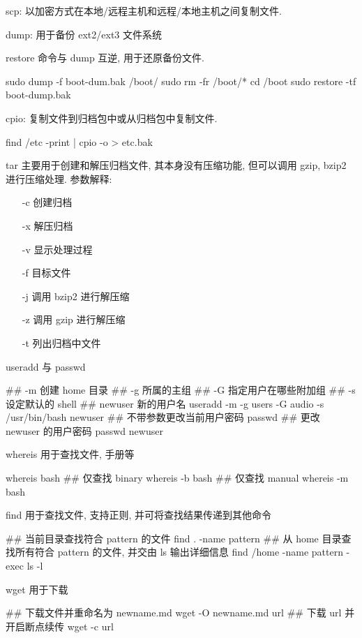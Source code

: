 scp: 以加密方式在本地/远程主机和远程/本地主机之间复制文件.

dump: 用于备份 ext2/ext3 文件系统

restore 命令与 dump 互逆, 用于还原备份文件.
\begin{shell}
sudo dump -f boot-dum.bak /boot/
sudo rm -fr /boot/*
cd /boot
sudo restore -tf boot-dump.bak
\end{shell}

cpio: 复制文件到归档包中或从归档包中复制文件.
\begin{shell}
find /etc -print | cpio -o > etc.bak
\end{shell}

tar 主要用于创建和解压归档文件, 其本身没有压缩功能, 但可以调用 gzip, bzip2 进行压缩处理.
参数解释:
\begin{itemize}
 \item[-c] 创建归档
 \item[-x] 解压归档
 \item[-v] 显示处理过程
 \item[-f] 目标文件
 \item[-j] 调用 bzip2 进行解压缩
 \item[-z] 调用 gzip 进行解压缩
 \item[-t] 列出归档中文件
\end{itemize}

useradd 与 passwd
\begin{shell}
## -m 创建 home 目录
## -g 所属的主组
## -G 指定用户在哪些附加组
## -s 设定默认的 shell
## newuser 新的用户名
useradd -m -g users -G audio -s /usr/bin/bash newuser
## 不带参数更改当前用户密码
passwd
## 更改 newuser 的用户密码
passwd newuser
\end{shell}

whereis 用于查找文件, 手册等
\begin{shell}
whereis bash
## 仅查找 binary
whereis -b bash
## 仅查找 manual
whereis -m bash
\end{shell}

find 用于查找文件, 支持正则, 并可将查找结果传递到其他命令
\begin{shell}
## 当前目录查找符合 pattern 的文件
find . -name pattern
## 从 home 目录查找所有符合 pattern 的文件, 并交由 ls 输出详细信息
find /home -name pattern -exec ls -l {} \;
\end{shell}

wget 用于下载
\begin{shell}
## 下载文件并重命名为 newname.md
wget -O newname.md url
## 下载 url 并开启断点续传
wget -c url
\end{shell}


